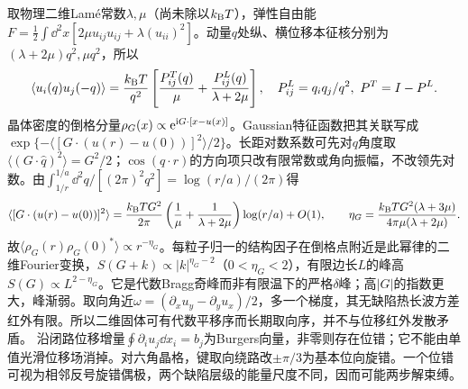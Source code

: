 \label{ch:melting}
取物理二维Lam\'e常数$\lambda,\mu$（尚未除以$k_{\mathrm B} T$），弹性自由能$F=\frac12\int\dd^2x[2\mu u_{ij}u_{ij}+\lambda(u_{ii})^2]$。动量$q$处纵、横位移本征核分别为$(\lambda+2\mu)q^2,\mu q^2$，所以
\begin{equation}
\langle u_i(q)u_j(-q)\rangle=\frac{k_{\mathrm B} T}{q^2}
\left[\frac{P^T_{ij}(q)}\mu+\frac{P^L_{ij}(q)}{\lambda+2\mu}\right],\quad
P^L_{ij}=q_iq_j/q^2,\ P^T=I-P^L.
\end{equation}
晶体密度的倒格分量$\rho_G(x)\propto\mathrm e^{\mathrm i G\cdot[x-u(x)]}$。Gaussian特征函数把其关联写成$\exp\{-\langle[G\cdot(u(r)-u(0))]^2\rangle/2\}$。长距对数系数可先对$q$角度取$\langle(G\cdot\hat q)^2\rangle=G^2/2$；$\cos(q\cdot r)$的方向项只改有限常数或角向振幅，不改领先对数。由$\int_{1/r}^{1/a}\dd^2q/[(2\pi)^2q^2]=\log(r/a)/(2\pi)$得
\begin{equation}
\langle[G\cdot(u(r)-u(0))]^2\rangle
=\frac{k_{\mathrm B} T G^2}{2\pi}\left(\frac1\mu+\frac1{\lambda+2\mu}\right)\log(r/a)+O(1),\qquad
\eta_G=\frac{k_{\mathrm B} T G^2(\lambda+3\mu)}{4\pi\mu(\lambda+2\mu)}.
\end{equation}
故$\langle\rho_G(r)\rho_G(0)^*\rangle\propto r^{-\eta_G}$。每粒子归一的结构因子在倒格点附近是此幂律的二维Fourier变换，$S(G+k)\propto|k|^{\eta_G-2}$（$0<\eta_G<2$），有限边长$L$的峰高$S(G)\propto L^{2-\eta_G}$。它是代数Bragg奇峰而非有限温下的严格$\delta$峰；高$|G|$的指数更大，峰渐弱。取向角近$\omega=(\partial_xu_y-\partial_yu_x)/2$，多一个梯度，其无缺陷热长波方差红外有限。所以二维固体可有代数平移序而长期取向序，并不与位移红外发散矛盾。
沿闭路位移增量$\oint\partial_i u_j\dd x_i=b_j$为Burgers向量，非零则存在位错；它不能由单值光滑位移场消掉。对六角晶格，键取向绕路改$\pm\pi/3$为基本位向旋错。一个位错可视为相邻反号旋错偶极，两个缺陷层级的能量尺度不同，因而可能两步解束缚。

